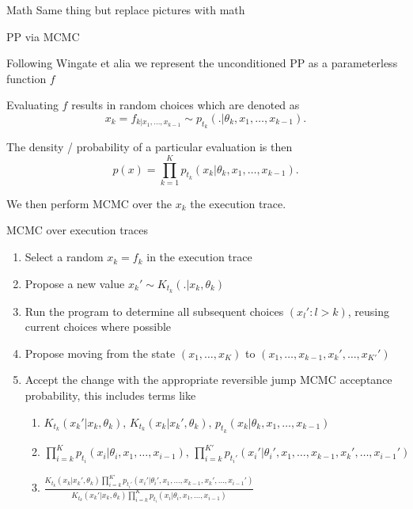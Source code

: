\begin{frame}{Math} 
Same thing but replace pictures with math
\end{frame}

\begin{frame}{PP via MCMC}
  \begin{block}{}
    Following Wingate et alia we represent the unconditioned PP as a parameterless function $f$
    \newline
    
    Evaluating $f$ results in random choices which are denoted as
    \begin{equation*}
      x_k = f_{k|x_1,\ldots,x_{k-1}} \sim p_{t_k}(.|\theta_{k},x_1,\ldots,x_{k-1}).
    \end{equation*}
    
    The density / probability of a particular evaluation is then
    \begin{equation*}
      p(x) = \prod_{k=1}^K p_{t_k}(x_k|\theta_{k},x_1,\ldots,x_{k-1}).
    \end{equation*}
    
    We then perform MCMC over the $x_k$ \ie the execution trace.
    
  \end{block}
\end{frame}

\begin{frame}{MCMC over execution traces}
  \begin{enumerate}
    \item Select a random $x_k = f_k$ in the execution trace
    \item Propose a new value $x_k' \sim K_{t_k}(.|x_k,\theta_k)$
    \item Run the program to determine all subsequent choices $(x_l' : l > k)$, reusing current choices where possible
    \item Propose moving from the state $(x_1,\ldots,x_K)$ to $(x_1,\ldots,x_{k-1},x_k',\ldots,x_{K'}')$
    \item Accept the change with the appropriate reversible jump MCMC acceptance probability, this includes terms like
    \begin{enumerate}
      \item $K_{t_k}(x_k'|x_k,\theta_k),\,K_{t_k}(x_k|x_k',\theta_k),\,p_{t_k}(x_k|\theta_{k},x_1,\ldots,x_{k-1})$
      \item $\prod_{i=k}^K p_{t_i}(x_i|\theta_{i},x_1,\ldots,x_{i-1}),\,\prod_{i=k}^{K'} p_{t_i'}(x_i'|\theta_{i}',x_1,\ldots,x_{k-1},x_k',\ldots,x_{i-1}')$
      \item \ie $\frac{K_{t_k}(x_k|x_k',\theta_k)\prod_{i=k}^{K'} p_{t_i'}(x_i'|\theta_{i}',x_1,\ldots,x_{k-1},x_k',\ldots,x_{i-1}')}{K_{t_k}(x_k'|x_k,\theta_k)\prod_{i=k}^K p_{t_i}(x_i|\theta_{i},x_1,\ldots,x_{i-1})}$
    \end{enumerate}
  \end{enumerate}
\end{frame}

